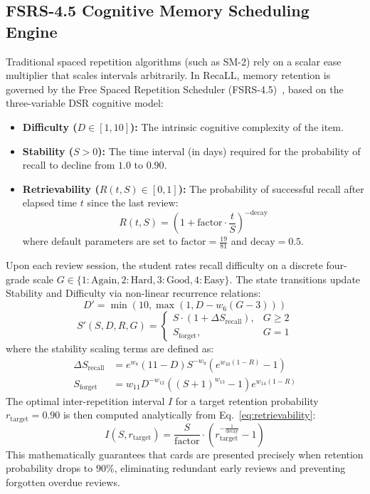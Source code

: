 \documentclass[conference]{IEEEtran}
\begin{document}
\subsection{FSRS-4.5 Cognitive Memory Scheduling Engine}
Traditional spaced repetition algorithms (such as SM-2) rely on a scalar ease multiplier that scales intervals arbitrarily. In RecaLL, memory retention is governed by the Free Spaced Repetition Scheduler (FSRS-4.5)~\cite{ye2022fsrs}, based on the three-variable DSR cognitive model:
\begin{itemize}
    \item \textbf{Difficulty ($D \in [1, 10]$):} The intrinsic cognitive complexity of the item.
    \item \textbf{Stability ($S > 0$):} The time interval (in days) required for the probability of recall to decline from $1.0$ to $0.90$.
    \item \textbf{Retrievability ($R(t, S) \in [0, 1]$):} The probability of successful recall after elapsed time $t$ since the last review:
    \begin{equation}
    R(t, S) = \left( 1 + \text{factor} \cdot \frac{t}{S} \right)^{-\text{decay}}
    \label{eq:retrievability}
    \end{equation}
    where default parameters are set to $\text{factor} = \frac{19}{81}$ and $\text{decay} = 0.5$.
\end{itemize}

Upon each review session, the student rates recall difficulty on a discrete four-grade scale $G \in \{1: \text{Again}, 2: \text{Hard}, 3: \text{Good}, 4: \text{Easy}\}$. The state transitions update Stability and Difficulty via non-linear recurrence relations:
\begin{equation}
D' = \min\left(10, \max\left(1, D - w_6 (G - 3)\right)\right)
\end{equation}
\begin{equation}
S'(S, D, R, G) = 
\begin{cases}
S \cdot \left( 1 + \Delta S_{\text{recall}} \right), & G \ge 2 \\
S_{\text{forget}}, & G = 1
\end{cases}
\label{eq:stability_update}
\end{equation}
where the stability scaling terms are defined as:
\begin{align}
\Delta S_{\text{recall}} &= e^{w_8} (11 - D) S^{-w_9} \left( e^{w_{10}(1-R)} - 1 \right) \label{eq:delta_s} \\
S_{\text{forget}} &= w_{11} D^{-w_{12}} \left( (S + 1)^{w_{13}} - 1 \right) e^{w_{14}(1-R)} \label{eq:s_forget}
\end{align}
The optimal inter-repetition interval $I$ for a target retention probability $r_{\text{target}} = 0.90$ is then computed analytically from Eq.~\eqref{eq:retrievability}:
\begin{equation}
I(S, r_{\text{target}}) = \frac{S}{\text{factor}} \cdot \left( r_{\text{target}}^{-\frac{1}{\text{decay}}} - 1 \right)
\end{equation}
This mathematically guarantees that cards are presented precisely when retention probability drops to $90\%$, eliminating redundant early reviews and preventing forgotten overdue reviews.
\end{document}
